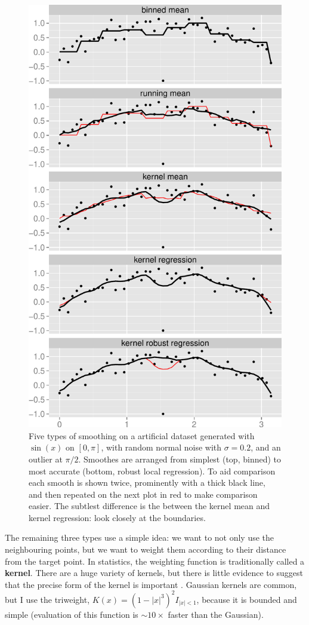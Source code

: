 \documentclass[journal]{vgtc}                %
\begin{document}
\begin{figure}[htb]
 \centering
 \includegraphics[width=0.75\linewidth]{smooth-types}
 \caption{Five types of smoothing on a artificial dataset generated with $\sin(x)$ on $[0, \pi]$, with random normal noise with $\sigma = 0.2$, and an outlier at $\pi / 2$. Smoothes are arranged from simplest (top, binned) to most accurate (bottom, robust local regression). To aid comparison each smooth is shown twice, prominently with a thick black line, and then repeated on the next plot in red to make comparison easier. The subtlest difference is the between the kernel mean and kernel regression: look closely at the boundaries.}
 \label{fig:smooth-types}
\end{figure}

The remaining three types use a simple idea: we want to not only use the neighbouring points, but we want to weight them according to their distance from the target point. In statistics, the weighting function is traditionally called a {\bf kernel}. There are a huge variety of kernels, but there is little evidence to suggest that the precise form of the kernel is important \citep{cleveland:1996}. Gaussian kernels are common, but I use the triweight, $K(x) = (1 - |x|^3)^2 I_{|x| < 1}$, because it is bounded and simple (evaluation of this function is $\sim 10 \times$ faster than the Gaussian).  
\end{document}
